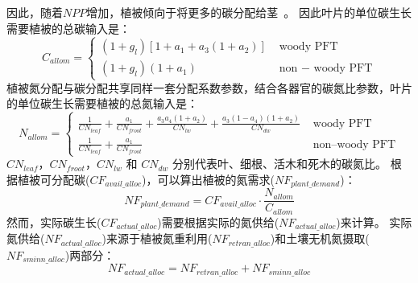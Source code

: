 因此，随着$NPP$增加，植被倾向于将更多的碳分配给茎~\citep{allen2005,vanninen2005carbon}。
因此叶片的单位碳生长需要植被的总碳输入是：
\begin{equation}\label{C_allom}
C_{ {allom }}=\left\{\begin{array}{lr}\left(1+g_{l}\right)\left[1+a_{1}+a_{3}\left(1+a_{2}\right)\right] &  \text{ woody } \text{PFT} \\ 
  \left(1+g_{l}\right)\left(1+a_{1}\right) &  \text{ non }- \text{ woody } \text{PFT}\end{array}\right.
\end{equation}
植被氮分配与碳分配共享同样一套分配系数参数，结合各器官的碳氮比参数，叶片的单位碳生长需要植被的总氮输入是：
\begin{equation}\label{N_allom}
N_{ {allom }}= \begin{cases}
\frac{1}{CN_{ {leaf }}}+\frac{a_{1}}{CN_{ {froot }}}+\frac{a_{3} a_{4}\left(1+a_{2}\right)}
  {CN_{l w}}+\frac{a_{3}\left(1-a_{4}\right)\left(1+a_{2}\right)}{CN_{d w}}  &  \text { woody PFT} \\ 
  \frac{1}{CN_{ {leaf }}}+\frac{a_{1}}{CN_{ {froot }}} & \text { non--woody PFT}
  \end{cases}
 \end{equation}
$CN_{leaf}$，$CN_{froot}$，$CN_{lw}$ 和 $CN_{dw}$ 分别代表叶、细根、活木和死木的碳氮比。
根据植被可分配碳($CF_{avail\_{alloc}}$)，可以算出植被的氮需求($NF_{plant\_{demand}}$)：
\begin{equation}
N F_{ {plant\_{demand }}}=CF_{ {avail\_{alloc }}} \cdot \frac{N_{ {allom }}}{C_{ {allom }}}
\end{equation}
然而，实际碳生长($CF_{actual\_{alloc}}$)需要根据实际的氮供给($NF_{actual\_{alloc}}$)来计算。
实际氮供给($NF_{actual\_{alloc}}$)来源于植被氮重利用($NF_{retran\_{alloc}}$)和土壤无机氮摄取($NF_{sminn\_{alloc}}$)两部分：
\begin{equation}\label{NF_actual_alloc}
NF_{actual\_{alloc}}=NF_{retran\_{alloc}}+NF_{sminn\_{alloc}}
\end{equation}


